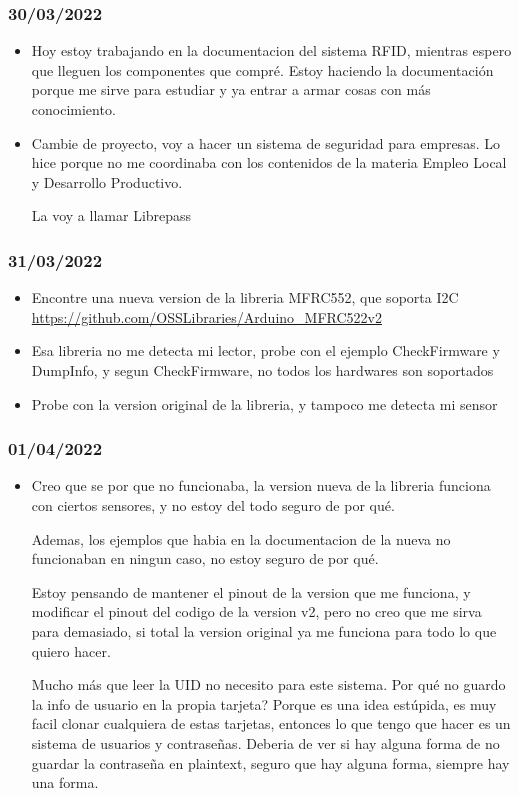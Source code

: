 \documentclass[../informe_krapp.tex]{subfiles}
\begin{document}
\subsubsection{30/03/2022}
\begin{itemize}
	\item Hoy estoy trabajando en la documentacion del sistema RFID, mientras espero
	      que lleguen los componentes que compré. Estoy haciendo la documentación porque
	      me sirve para estudiar y ya entrar a armar cosas con más conocimiento.
	\item Cambie de proyecto, voy a hacer un sistema de seguridad para empresas.
	      Lo hice porque no me coordinaba con los contenidos de la materia
	      Empleo Local y Desarrollo Productivo.

	      La voy a llamar Librepass
\end{itemize}

\subsubsection{31/03/2022}
\begin{itemize}
	\item Encontre una nueva version de la libreria MFRC552, que soporta I2C
	      \url{https://github.com/OSSLibraries/Arduino_MFRC522v2}
	\item Esa libreria no me detecta mi lector, probe con el ejemplo CheckFirmware y
	      DumpInfo, y segun CheckFirmware, no todos los hardwares son soportados
	\item Probe con la version original de la libreria, y tampoco me detecta mi sensor
\end{itemize}

\subsubsection{01/04/2022}
\begin{itemize}
	\item Creo que se por que no funcionaba, la version nueva de la libreria funciona
	      con ciertos sensores, y no estoy del todo seguro de por qué.

	      Ademas, los ejemplos que habia en la documentacion de la nueva no funcionaban en ningun
	      caso, no estoy seguro de por qué.

	      Estoy pensando de mantener el pinout de la version que me funciona, y modificar
	      el pinout del codigo de la version v2, pero no creo que me sirva para demasiado, si
	      total la version original ya me funciona para todo lo que quiero hacer.

	      Mucho más que leer la UID no necesito para este sistema. Por qué no guardo la info
	      de usuario en la propia tarjeta? Porque es una idea estúpida, es muy facil
	      clonar cualquiera de estas tarjetas, entonces lo que tengo que hacer es un sistema de
	      usuarios y contraseñas. Deberia de ver si hay alguna forma de no guardar la contraseña
	      en plaintext, seguro que hay alguna forma, siempre hay una forma.
\end{itemize}
\end{document}
